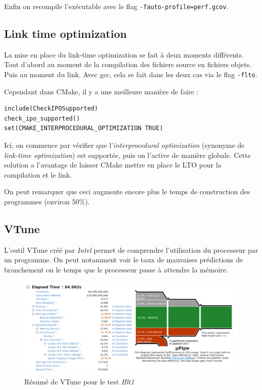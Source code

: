 \documentclass[a4paper]{report}
\begin{document}
            Enfin on recompile l'exécutable avec le flag \verb'-fauto-profile=perf.gcov'.

        \subsection{Link time optimization}
            La mise en place du link-time optimization se fait à deux moments différents.
            Tout d'abord au moment de la compilation des fichiers source en fichiers objets.
            Puis au moment du link.
            Avec gcc, cela se fait dans les deux cas via le flag \verb'-flto'.

            Cependant dans CMake, il y a une meilleure manière de faire :
            \begin{verbatim}
include(CheckIPOSupported)
check_ipo_supported()
set(CMAKE_INTERPROCEDURAL_OPTIMIZATION TRUE)
            \end{verbatim}
            Ici, on commence par vérifier que l'\emph{interprocedural optimization} (synonyme de \emph{link-time optimization}) est supportée, puis on l'active de manière globale.
            Cette solution a l'avantage de laisser CMake mettre en place le LTO pour la compilation et le link.

            On peut remarquer que ceci augmente encore plus le temps de construction des programmes (environ $50\%$).

        \subsection{VTune}
            L'outil VTune créé par \emph{Intel} permet de comprendre l'utilisation du processeur par un programme.
            On peut notamment voir le taux de mauvaises prédictions de branchement ou le temps que le processeur passe à attendre la mémoire.

            \begin{figure}[H]
                \includegraphics[width=\textwidth, center]{vtune_hlt1.png}
                \caption{Résumé de VTune pour le test \emph{Hlt1}}
                \label{vtune_hlt1}
            \end{figure}
\end{document}
